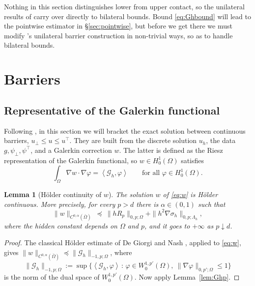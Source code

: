 \documentclass[12pt]{amsart}
\numberwithin{equation}{section}
\theoremstyle{plain}
\newtheorem{lemma}[theorem]{Lemma}
\theoremstyle{definition}
\theoremstyle{remark}
\newcommand{\Om}{\Omega}
\newcommand{\psilo}{\psi_\bot}
\newcommand{\psiup}{\psi^\top}
\newcommand{\Gh}{\mathcal{G}_h}
\newcommand{\Lamh}{\Lambda_h}
\begin{document}
Nothing in this section distinguishes lower from upper contact, so the unilateral results of \cite[\S 3]{NSV03} carry over directly to bilateral bounds.  Bound \eqref{eq:Ghbound} will lead to the pointwise estimator in \S \ref{sec:pointwise}, but before we get there we must modify \cite{NSV03}'s unilateral barrier construction in non-trivial ways, so as to handle bilateral bounds.


\section{Barriers} \label{sec:barriers}

\subsection{Representative of the Galerkin functional}  Following \cite[\S 4]{NSV03}, in this section we will bracket the exact solution between continuous barriers, $u_\bot \le u \le u^\top$.  They are built from the discrete solution $u_h$, the data $g,\psilo,\psiup$, and a Galerkin correction $w$.  The latter is defined as the Riesz representation of the Galerkin functional, so $w \in H_0^1(\Om)$ satisfies
\begin{equation}
\label{eq:w}
  \int_\Om \nabla w \cdot \nabla\varphi = \left<\Gh,\varphi\right> \qquad \text{for all } \varphi \in H_0^1(\Om).
\end{equation}

\begin{lemma}[H\"older continuity of $w$]
\label{lem:holder}
The solution $w$ of \eqref{eq:w} is H\"older continuous.  More precisely, for every $p > d$ there is $\alpha \in (0,1)$ such that
\begin{equation}
\label{eq:holder}
  \|w\|_{C^{0,\alpha}(\bar\Om)} \ \preceq\ \|h R_p\|_{0,p;\Om} + \|h^2\nabla\sigma_h\|_{0,p;\Lamh},
\end{equation}
where the hidden constant depends on $\Om$ and $p$, and it goes to $+\infty$ as $p \downarrow d$.
\end{lemma}

\begin{proof}
The classical H\"older estimate of De Giorgi and Nash \cite[Theorem C.2]{KinderlehrerStampacchia1980}, applied to \eqref{eq:w}, gives $\|w\|_{C^{0,\alpha}(\bar\Om)} \preceq \|\Gh\|_{-1,p;\Om}$, where
\[
  \|\Gh\|_{-1,p;\Om} := \sup\bigl\{\left<\Gh,\varphi\right> \,:\, \varphi \in W_0^{1,p'}(\Om),\ \|\nabla\varphi\|_{0,p';\Om} \le 1\bigr\}
\]
is the norm of the dual space of $W_0^{1,p'}(\Om)$.  Now apply Lemma~\ref{lem:Ghp}.
\end{proof}
\end{document}
